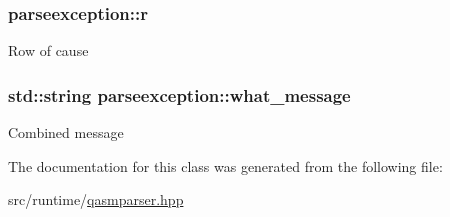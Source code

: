 \subsubsection[{\texorpdfstring{r}{r}}]{ parseexception\+::r}\hypertarget{classparseexception_a0e50402f7511e71332099355061b26ca}{}\label{classparseexception_a0e50402f7511e71332099355061b26ca}
Row of cause 
\subsubsection[{\texorpdfstring{what\+\_\+message}{what_message}}]{\setlength{\rightskip}{0pt plus 5cm}std\+::string parseexception\+::what\+\_\+message\hspace{0.3cm}{\ttfamily [private]}}\hypertarget{classparseexception_a4807889c64609ea29a275c9f66c15e61}{}\label{classparseexception_a4807889c64609ea29a275c9f66c15e61}
Combined message 

The documentation for this class was generated from the following file\+:\begin{DoxyCompactItemize}
\item 
src/runtime/\hyperlink{qasmparser_8hpp}{qasmparser.\+hpp}\end{DoxyCompactItemize}
